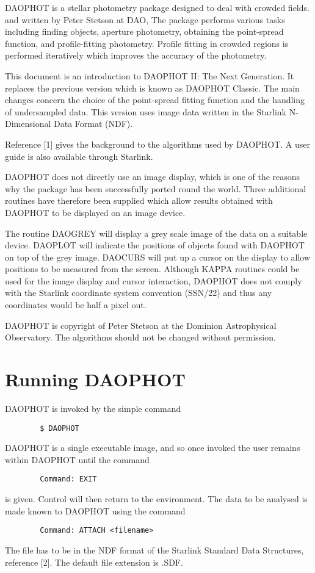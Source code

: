 DAOPHOT is a stellar photometry package designed to deal with crowded fields.
and written by Peter Stetson at DAO,
The package performs various tasks including finding objects, aperture
photometry, obtaining the point-spread function, and profile-fitting photometry.
Profile fitting in crowded regions is performed iteratively which improves the
accuracy of the photometry.

This document is an introduction to DAOPHOT II: The Next Generation. It
replaces the previous version which is known as DAOPHOT Classic. The main
changes concern the choice of the point-spread fitting function and the
handling of undersampled data. This version uses image data written in the
Starlink N-Dimensional Data Format (NDF).

Reference [1] gives the background to the algorithms used by DAOPHOT. A user
guide is also available through Starlink.

DAOPHOT does not directly use an image display, which is one of the
reasons why the package has been successfully ported round the world.
Three additional routines have therefore been supplied which allow results
obtained with DAOPHOT to be displayed on an image device.

The routine DAOGREY will display a grey scale image of the data on a suitable
device. DAOPLOT will indicate the positions of objects found with DAOPHOT on
top of the grey image. DAOCURS will put up a cursor on the display to allow
positions to be measured from the screen. Although KAPPA routines could be used
for the image display and cursor interaction, DAOPHOT does not comply with the
Starlink coordinate system convention (SSN/22) and thus any coordinates would
be half a pixel out.

DAOPHOT is copyright of Peter Stetson at the Dominion Astrophysical Observatory.
The algorithms should not be changed without permission.

\section{Running DAOPHOT}

DAOPHOT is invoked by the simple command
\begin{verbatim}
        $ DAOPHOT
\end{verbatim}
DAOPHOT is a single executable image, and so once invoked the user remains
within DAOPHOT until the command
\begin{verbatim}
        Command: EXIT
\end{verbatim}
is given. Control will then return to the environment. The data to be analysed
is made known to DAOPHOT using the command
\begin{verbatim}
        Command: ATTACH <filename>
\end{verbatim}
The file has to be in the NDF format of the Starlink Standard Data Structures,
reference [2]. The default file extension is .SDF.

